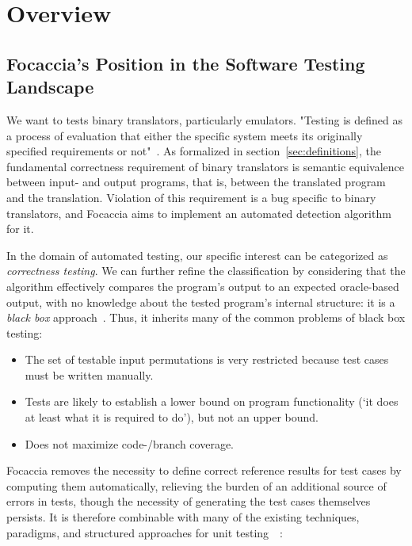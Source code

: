 \chapter{Overview}

\section{Focaccia's Position in the Software Testing Landscape}

We want to tests binary translators, particularly emulators. "Testing is defined as a process of evaluation that either
the specific system meets its originally specified requirements or not"~\cite{jamil2016software_testing}. As formalized
in section~\ref{sec:definitions}, the fundamental correctness requirement of binary translators is semantic equivalence
between input- and output programs, that is, between the translated program and the translation. Violation of this
requirement is a bug specific to binary translators, and Focaccia aims to implement an automated detection algorithm for
it.

In the domain of automated testing, our specific interest can be categorized as \textit{correctness testing}. We can
further refine the classification by considering that the algorithm effectively compares the program's output to an
expected oracle-based output, with no knowledge about the tested program's internal structure: it is a \textit{black
box} approach~\cite{sawant2012software}. Thus, it inherits many of the common problems of black box testing:

\begin{itemize}
    \item The set of testable input permutations is very restricted because test cases must be written manually.
    \item Tests are likely to establish a lower bound on program functionality (`it does at least what it is required to
        do'), but not an upper bound.
    \item Does not maximize code-/branch coverage.
\end{itemize}

Focaccia removes the necessity to define correct reference results for test cases by computing them automatically,
relieving the burden of an additional source of errors in tests, though the necessity of generating the test cases
themselves persists. It is therefore combinable with many of the existing techniques, paradigms, and structured
approaches for unit testing~\cite{jan2016innovative}~\cite{yu2011robust_planning}:

